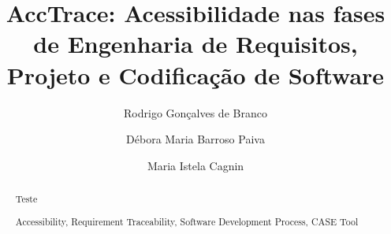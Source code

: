 \documentclass[runningheads,a4paper]{llncs}
\newcommand{\keywords}[1]{\par\addvspace\baselineskip
\noindent\keywordname\enspace\ignorespaces#1}
\begin{document}
\mainmatter  %

\title{AccTrace: Acessibilidade nas fases de Engenharia de Requisitos, Projeto e Codificação de Software}



%
%
\author{Rodrigo Gonçalves de Branco%
\and Débora Maria Barroso Paiva \and Maria Istela Cagnin}



%
%

\maketitle


\begin{abstract}

Teste

\keywords{Accessibility, Requirement Traceability, Software Development
Process, CASE Tool}
\end{abstract}
\end{document}
